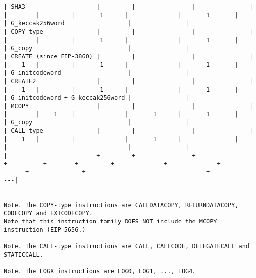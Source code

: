 \documentclass[varwidth=\maxdimen,margin=0.5cm,multi={verbatim}]{standalone}
\begin{document}
\begin{verbatim}
| SHA3                    |         |                |               |          |        |         |       1      |              |       1       |               | G_keccak256word                  |               |
| COPY-type               |         |                |               |          |        |         |       1      |              |       1       |               | G_copy                           |               |
| CREATE (since EIP-3860) |         |                |               |          |    1   |         |       1      |              |       1       |               | G_initcodeword                   |               |
| CREATE2                 |         |                |               |          |    1   |         |       1      |              |       1       |               | G_initcodeword + G_keccak256word |               |
| MCOPY                   |         |                |               |          |        |    1    |              |       1      |       1       |               | G_copy                           |               |
| CALL-type               |         |                |               |          |    1   |         |              |       1      |               |               |                                  |               |
|-------------------------+---------+----------------+---------------+----------+--------+---------+--------------+--------------+---------------+---------------+----------------------------------+---------------|


Note. The COPY-type instructions are CALLDATACOPY, RETURNDATACOPY, CODECOPY and EXTCODECOPY.
Note that this instruction family DOES NOT include the MCOPY instruction (EIP-5656.)

Note. The CALL-type instructions are CALL, CALLCODE, DELEGATECALL and STATICCALL.

Note. The LOGX instructions are LOG0, LOG1, ..., LOG4.

\end{verbatim}
\end{document}
